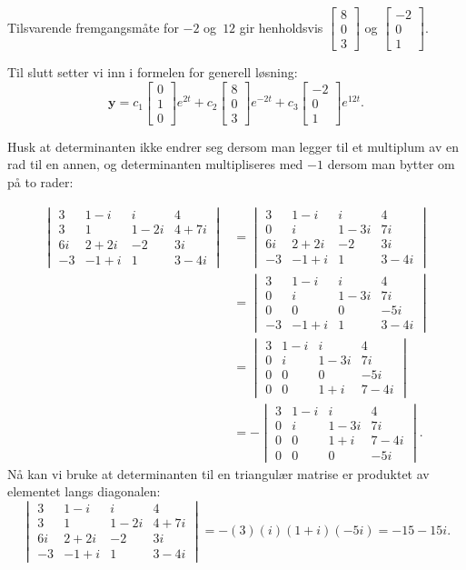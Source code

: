 \documentclass[titlepage,a4paper,12pt,norsk]{IMFeksamen}
\newcommand{\V}[1]{\mathbf{#1}}
\newcommand{\vvv}[3]{\begin{bmatrix} #1 \\ #2 \\ #3 \end{bmatrix}}
\newcommand{\0}{\V{0}}
\begin{document}
\begin{oppgave}
\noindent
Tilsvarende fremgangsmåte for $-2$ og~$12$ gir henholdsvis $\vvv{8}{0}{3}$ og $\vvv{-2}{0}{1}$.


\noindent
Til slutt setter vi inn i formelen for generell løsning:
$$\V{y} = c_1\vvv{0}{1}{0}e^{2t}+c_2\vvv{8}{0}{3}e^{-2t}+c_3 \vvv{-2}{0}{1}e^{12t}.$$
\end{oppgave}


\begin{oppgave}
Husk at determinanten ikke endrer seg dersom man legger til et multiplum av en rad til en annen, og determinanten multipliseres med $-1$ dersom man bytter om på to rader:

\begin{align*}
\begin{vmatrix}
3  &  1 - i  & i      & 4      \\
3  &  1      & 1 - 2i & 4 + 7i \\
6i &  2 + 2i & -2     & 3i     \\
-3 & -1 + i  & 1      & 3 - 4i
\end{vmatrix} &=
\begin{vmatrix}
3  &  1 - i   & i      & 4  \\
0  &  i       & 1 - 3i & 7i \\
6i &  2 + 2i  & -2     & 3i \\
-3 & -1 + i   & 1      & 3 - 4i
\end{vmatrix}\\ &=
\begin{vmatrix}
3  &  1 - i  & i      & 4  \\
0  &  i      & 1 - 3i & 7i \\
0  &  0      & 0     & -5i \\
-3 & -1 + i  & 1     & 3 - 4i
\end{vmatrix}\\ &=
\begin{vmatrix}
3 &  1 - i  & i      & 4  \\
0 &  i      & 1 - 3i & 7i \\
0 &  0      & 0      & -5i\\
0 &  0      & 1+i    & 7 - 4i
\end{vmatrix}\\ &=
-\begin{vmatrix}
3 &  1 - i  & i      & 4     \\
0 &  i      & 1 - 3i & 7i    \\
0 &  0      & 1+i    & 7 - 4i\\
0 &  0      & 0      & -5i
\end{vmatrix}.
\end{align*}
Nå kan vi bruke at determinanten til en triangulær matrise er produktet av elementet langs diagonalen:
\[
\begin{vmatrix}
3  &  1 - i  & i      & 4      \\
3  &  1      & 1 - 2i & 4 + 7i \\
6i &  2 + 2i & -2     & 3i     \\
-3 & -1 + i  & 1      & 3 - 4i
\end{vmatrix} 
=-(3)(i)(1+i)(-5i)=-15-15i.
\]

\end{oppgave}
\end{document}
